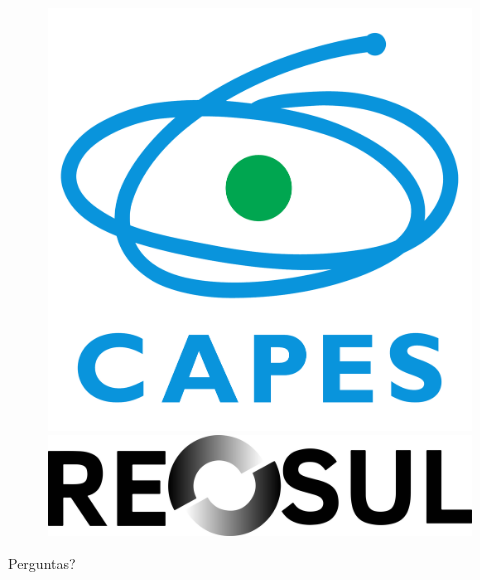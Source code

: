 \documentclass[aspectratio=169]{beamer}
\begin{document}
\begin{frame}
\begin{figure}
\begin{minipage}[c][0.2\textheight][c]{0.24\textwidth}
            \includegraphics[height=0.16\textheight]{images/logos/capes.pdf}
        \end{minipage}
        \hfill
        \begin{minipage}[c][0.2\textheight][c]{0.24\textwidth}
            \centering
            \includegraphics[height=0.10\textheight]{images/logos/reosul.png}
        \end{minipage}
    \end{figure}
\end{frame}

\begin{frame}
    \tableofcontents[sectionstyle=show,subsectionstyle=show/shaded/hide,subsubsectionstyle=show/shaded/hide]
\end{frame}
















\begin{frame}[allowframebreaks]
    \printbibliography
\end{frame}

\begin{frame}
    \begin{center}
        {\Huge Perguntas?}
    \end{center}
\end{frame}
\end{document}
